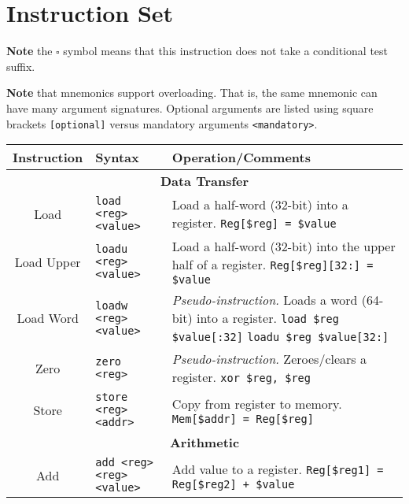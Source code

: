 \documentclass{article}
\begin{document}
\section{Instruction Set}

\textbf{Note} the \(\square\) symbol means that this instruction does not take a conditional test suffix.

\textbf{Note} that mnemonics support overloading.
That is, the same mnemonic can have many argument signatures.
Optional arguments are listed using square brackets \texttt{[optional]} versus mandatory arguments \texttt{<mandatory>}.

\begin{longtable}{|c|l|l|}
    \hline
    \textbf{Instruction} & \textbf{Syntax} & \textbf{Operation/Comments} \\
    \hline
    \multicolumn{3}{|c|}{\textbf{Data Transfer}} \\
    \hline
    Load & \texttt{load <reg> <value>} & \makecell[l]{Load a half-word (32-bit) into a register.\\\texttt{Reg[\$reg] = \$value}} \\
    \hline
    Load Upper & \texttt{loadu <reg> <value>} & \makecell[l]{Load a half-word (32-bit) into the upper half of a register.\\\texttt{Reg[\$reg][32:] = \$value}} \\
    \hline
    Load Word & \texttt{loadw <reg> <value>} & \makecell[l]{\textit{Pseudo-instruction.}\\%
    Loads a word (64-bit) into a register.\\%
    \texttt{load \$reg \$value[:32]}\\%
    \texttt{loadu \$reg \$value[32:]}} \\
    \hline
    Zero & \texttt{zero <reg>} & \makecell[l]{\textit{Pseudo-instruction.}\\%
    Zeroes/clears a register.\\%
    \texttt{xor \$reg, \$reg}} \\
    \hline
    Store & \texttt{store <reg> <addr>} & \makecell[l]{Copy from register to memory.\\\texttt{Mem[\$addr] = Reg[\$reg]}} \\
    \hline \hline
    \multicolumn{3}{|c|}{\textbf{Arithmetic}} \\
    \hline
    Add & \texttt{add <reg> <reg> <value>} & \makecell[l]{Add value to a register.\\%
    \texttt{Reg[\$reg1] = Reg[\$reg2] + \$value}} \\

\end{longtable}
\end{document}
